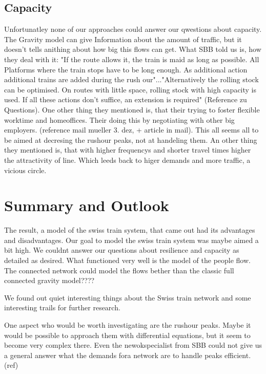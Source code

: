 \documentclass[11pt]{article}
\begin{document}
\subsection{Capacity}

Unfortunatley none of our approaches could answer our qwestions about capacity. The Gravity model can give Information about the amount of traffic, but it doesn't tells anithing about how big this flows can get. What SBB told us is, how they deal with it: "If the route allows it, the train is maid as long as possible. All Platforms where the train stops have to be long enough. As additional action additional trains are added during the rush our"..."Alternatively the rolling stock can be optimised. On routes with little space, rolling stock with high capacity is used. If all these actions don't suffice, an extension is required" (Reference zu Questions). One other thing they mentioned is, that their trying to foster flexible worktime and homeoffices. Their doing this by negotiating with other big employers. (reference mail mueller 3. dez, + article in mail). This all seems all to be aimed at decresing the rushour peaks, not at handeling them. An other thing they mentioned is, that with higher frequencys and shorter travel times higher the attractivity of line. Which leeds back to higer demands and more traffic, a vicious circle.




\section{Summary and Outlook}

The result, a model of the swiss train system, that came out had its advantages and disadvantages. Our goal to model the swiss train system was maybe aimed a bit high. We couldnt answer our questions about resilience and capacity as detailed as desired. What functioned very well is the model of the people flow. The connected network could model the flows bether than the classic full connected gravity model????\newline 

 

We found out quiet interesting things about the Swiss train network and some interesting trails for further research.\newline

One aspect who would be worth investigating are the rushour peaks. Maybe it would be possible to approach them with differential equations, but it seem to become very complex there. Even the newokspecialist from SBB could not  give us a general answer what the demands fora network are to handle peaks efficient. (ref)
\end{document}
